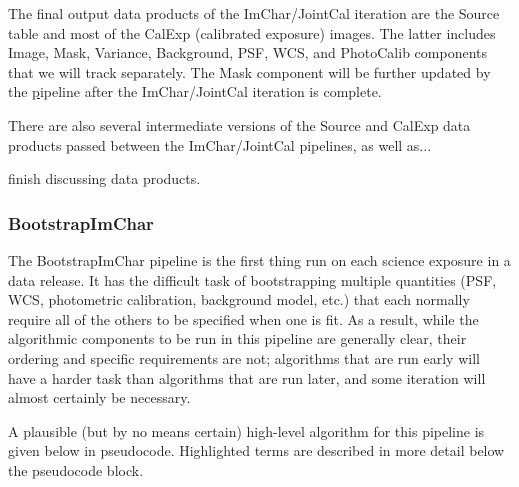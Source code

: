 The final output data products of the ImChar/JointCal iteration are the Source table and most of the CalExp (calibrated exposure) images.  The latter includes Image, Mask, Variance, Background, PSF, WCS, and PhotoCalib components that we will track separately.  The Mask component will be further updated by the \hyperref[sec:drpDiffIm] pipeline after the ImChar/JointCal iteration is complete.

There are also several intermediate versions of the Source and CalExp data products passed between the ImChar/JointCal pipelines, as well as...

\begin{note}[TODO]
  finish discussing data products.
\end{note}

\subsubsection{BootstrapImChar}
\label{sec:drpBootstrapImChar}

The BootstrapImChar pipeline is the first thing run on each science exposure in a data release.  It has the difficult task of bootstrapping multiple quantities (PSF, WCS, photometric calibration, background model, etc.) that each normally require all of the others to be specified when one is fit.  As a result, while the algorithmic components to be run in this pipeline are generally clear, their ordering and specific requirements are not; algorithms that are run early will have a harder task than algorithms that are run later, and some iteration will almost certainly be necessary.

A plausible (but by no means certain) high-level algorithm for this pipeline is given below in pseudocode.  Highlighted terms are described in more detail below the pseudocode block.


\newcommand{\hr}[1]{\hyperref[sec:drpBootstrapImChar_#1]{#1}}

